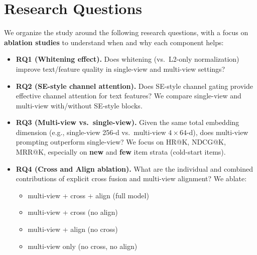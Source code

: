 \section{Research Questions}
We organize the study around the following research questions,
with a focus on \textbf{ablation studies} to understand when
and why each component helps:

\begin{itemize}[leftmargin=*,itemsep=3pt]
  \item \textbf{RQ1 (Whitening effect).}
    Does whitening (vs.\ L2-only normalization) improve
    text/\llm feature quality in single-view and multi-view
    settings?
  
  \item \textbf{RQ2 (SE-style channel attention).}
    Does SE-style channel gating provide effective channel attention for
    text features? We compare single-view and multi-view
    with/without SE-style blocks.
  
  \item \textbf{RQ3 (Multi-view vs.\ single-view).}
    Given the same total embedding dimension (e.g.,
    single-view 256-d vs.\ multi-view $4\times 64$-d), does
    multi-view prompting outperform single-view? We focus on
    HR@K, NDCG@K, MRR@K, especially on \textbf{new} and
    \textbf{few} item strata (cold-start items).
  
  \item \textbf{RQ4 (Cross and Align ablation).}
    What are the individual and combined contributions of
    explicit cross fusion and multi-view alignment? We ablate:
  \begin{itemize}[leftmargin=*,itemsep=1pt]
    \item multi-view + cross + align (full model)
    \item multi-view + cross (no align)
    \item multi-view + align (no cross)
    \item multi-view only (no cross, no align)
  \end{itemize}
\end{itemize}

